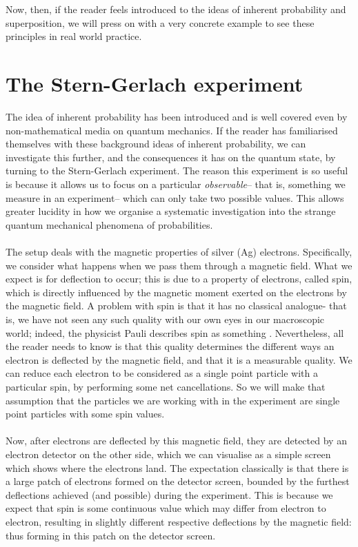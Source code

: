 \\\\
Now, then, if the reader feels introduced to the ideas of inherent probability and superposition, we will press on with a very concrete example to see these principles in real world practice.
\section{The Stern-Gerlach experiment}
The idea of inherent probability has been introduced and is well covered even by non-mathematical media on quantum mechanics. If the reader has familiarised themselves with these background ideas of inherent probability, we can investigate this further, and the consequences it has on the quantum state, by turning to the Stern-Gerlach experiment. The reason this experiment is so useful is because it allows us to focus on a particular \textit{observable}-- that is, something we measure in an experiment-- which can only take two possible values. This allows greater lucidity in how we organise a systematic investigation into the strange quantum mechanical phenomena of probabilities.
\\\\
The setup deals with the magnetic properties of silver (Ag) electrons. Specifically, we consider what happens when we pass them through a magnetic field. What we expect is for deflection to occur; this is due to a property of electrons, called spin, which is directly influenced by the magnetic moment exerted on the electrons by the magnetic field. A problem with spin is that it has no classical analogue- that is, we have not seen any such quality with our own eyes in our macroscopic world; indeed, the physicist Pauli describes spin as something . Nevertheless, all the reader needs to know is that this quality determines the different ways an electron is deflected by the magnetic field, and that it is a measurable quality. We can reduce each electron to be considered as a single point particle with a particular spin, by performing some net cancellations. So we will make that assumption that the particles we are working with in the experiment are single point particles with some spin values.
\\\\
Now, after electrons are deflected by this magnetic field, they are detected by an electron detector on the other side, which we can visualise as a simple screen which shows where the electrons land. The expectation classically is that there is a large patch of electrons formed on the detector screen, bounded by the furthest deflections achieved (and possible) during the experiment. This is because we expect that spin is some continuous value which may differ from electron to electron, resulting in slightly different respective deflections by the magnetic field: thus forming in this patch on the detector screen.
